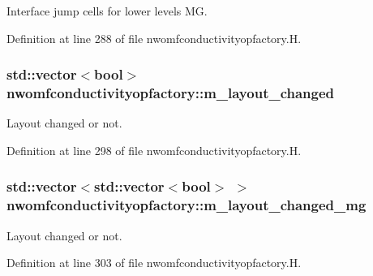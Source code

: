 Interface jump cells for lower levels MG. 



Definition at line 288 of file nwomfconductivityopfactory.\+H.

\subsubsection[{\texorpdfstring{m\+\_\+layout\+\_\+changed}{m_layout_changed}}]{\setlength{\rightskip}{0pt plus 5cm}std\+::vector$<$bool$>$ nwomfconductivityopfactory\+::m\+\_\+layout\+\_\+changed\hspace{0.3cm}{\ttfamily [protected]}}\hypertarget{classnwomfconductivityopfactory_a870f179a8a1fbafc015f13dc8d48813f}{}\label{classnwomfconductivityopfactory_a870f179a8a1fbafc015f13dc8d48813f}


Layout changed or not. 



Definition at line 298 of file nwomfconductivityopfactory.\+H.

\subsubsection[{\texorpdfstring{m\+\_\+layout\+\_\+changed\+\_\+mg}{m_layout_changed_mg}}]{\setlength{\rightskip}{0pt plus 5cm}std\+::vector$<$std\+::vector$<$bool$>$ $>$ nwomfconductivityopfactory\+::m\+\_\+layout\+\_\+changed\+\_\+mg\hspace{0.3cm}{\ttfamily [protected]}}\hypertarget{classnwomfconductivityopfactory_a6b4e98b82cf6b8316d900f7f1618e925}{}\label{classnwomfconductivityopfactory_a6b4e98b82cf6b8316d900f7f1618e925}


Layout changed or not. 



Definition at line 303 of file nwomfconductivityopfactory.\+H.

